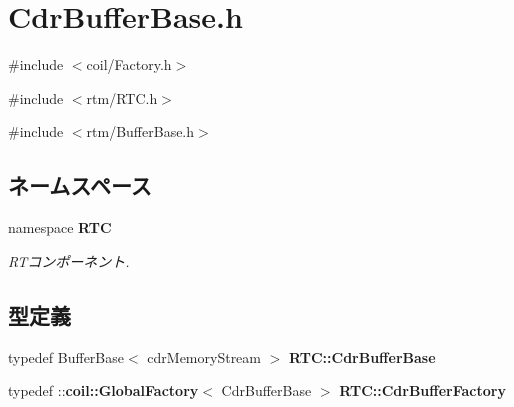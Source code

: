 \section{CdrBufferBase.h}
\label{CdrBufferBase_8h}
{\ttfamily \#include $<$coil/Factory.h$>$}\par
{\ttfamily \#include $<$rtm/RTC.h$>$}\par
{\ttfamily \#include $<$rtm/BufferBase.h$>$}\par
\subsection*{ネームスペース}
\begin{DoxyCompactItemize}
\item 
namespace {\bf RTC}


\begin{DoxyCompactList}\small\item\em RTコンポーネント. \item\end{DoxyCompactList}

\end{DoxyCompactItemize}
\subsection*{型定義}
\begin{DoxyCompactItemize}
\item 
typedef BufferBase$<$ cdrMemoryStream $>$ {\bf RTC::CdrBufferBase}
\item 
typedef ::{\bf coil::GlobalFactory}$<$ CdrBufferBase $>$ {\bf RTC::CdrBufferFactory}
\end{DoxyCompactItemize}

